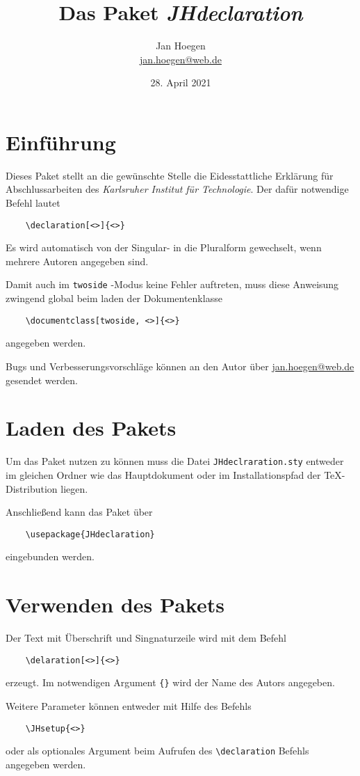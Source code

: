 \documentclass[%
	fontsize=10pt, 
	DIV=8, 
]{scrartcl}
\title{Das Paket \textit{JHdeclaration}}
\author{Jan Hoegen\\\href{mailto:jan.hoegen@web.de}{jan.hoegen@web.de}}
\date{28. April 2021}
\begin{document}
\maketitle

\section{Einführung}
Dieses Paket stellt an die gewünschte Stelle die Eidesstattliche Erklärung für Abschlussarbeiten des \textit{Karlsruher Institut für Technologie}. Der dafür notwendige Befehl lautet
\begin{verbatim}
	\declaration[<>]{<>}
\end{verbatim} 
Es wird automatisch von der Singular- in die Pluralform gewechselt, wenn mehrere Autoren angegeben sind.\par
Damit auch im \verb+twoside+ -Modus keine Fehler auftreten, muss diese Anweisung zwingend global beim laden der Dokumentenklasse
\begin{verbatim}
	\documentclass[twoside, <>]{<>}
\end{verbatim} 
angegeben werden.\par
Bugs und Verbesserungsvorschläge können an den Autor über \href{mailto:jan.hoegen@web.de}{jan.hoegen@web.de} gesendet werden.

\section{Laden des Pakets}

Um das Paket nutzen zu können muss die Datei \verb+JHdeclraration.sty+ entweder im gleichen Ordner wie das Hauptdokument oder im Installationspfad der \TeX -Distribution liegen. \par
Anschließend kann das Paket über
\begin{verbatim}
	\usepackage{JHdeclaration}
\end{verbatim}
eingebunden werden.

\section{Verwenden des Pakets}
Der Text mit Überschrift und Singnaturzeile wird mit dem Befehl 
\begin{verbatim}
	\delaration[<>]{<>}
\end{verbatim}
erzeugt. Im notwendigen Argument \verb+{}+ wird der Name des Autors angegeben.

Weitere Parameter können entweder mit Hilfe des Befehls
\begin{verbatim}
	\JHsetup{<>}
\end{verbatim}
oder als optionales Argument beim Aufrufen des \verb+\declaration+ Befehls angegeben werden.
\end{document}
